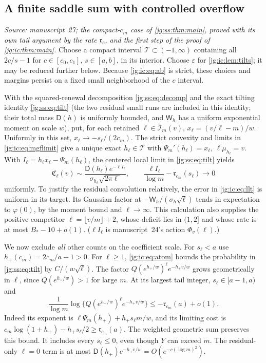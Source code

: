 \documentclass[11pt,a4paper]{article}
\theoremstyle{definition}\newaliascnt{definition}{theorem}
\theoremstyle{remark}\newaliascnt{remark}{theorem}
\begin{document}
\subsection{A finite saddle sum with controlled overflow}
\label{jg:sec:ic-saddle}
\emph{Source: manuscript~27; the compact-$c_m$ case of \cref{jg:ss:thm:main},
proved with its own tail argument by the rate $\mathfrak r_c$, and the first
step of the proof of \cref{jg:ic:thm:main}.} Choose a compact interval
$\mathcal T\subset(-1,\infty)$ containing all $2c/s-1$ for $c\in[c_0,c_1]$,
$s\in[a,b]$, in its interior. Choose $\varepsilon$ for \cref{jg:ic:lem:tilts};
it may be reduced further below. Because \eqref{jg:ic:eq:ab} is strict, these
choices and margins persist on a fixed small neighborhood of the $c$ interval.

With the squared-renewal decomposition \eqref{jg:ss:eq:decomp} and the exact
tilting identity \eqref{jg:ss:eq:tilt} (the two residual small runs are
included in this identity; their total mass $\mathsf D(h)$ is uniformly bounded,
and $\mathsf W_h$ has a uniform exponential moment on scale $w$), put, for each
retained $\ell\in\mathcal I_m(v)$, $x_\ell=(v/\ell-m)/w$. Uniformly in this set,
$x_\ell\to-s_\ell/(2c_m)$. The strict convexity and limits in
\eqref{jg:ic:eq:mgflimit} give a unique exact $h_\ell\in\mathcal T$ with
$\Psi_m'(h_\ell)=x_\ell$, $\ell\mu_{h_\ell}=v$. With
$I_\ell=h_\ell x_\ell-\Psi_m(h_\ell)$, the centered local limit in
\eqref{jg:ss:eq:tilt} yields
\begin{equation}\label{jg:ic:eq:saddle}
 \mathfrak C_\ell(v)\sim
 \frac{\mathsf D(h_\ell)e^{-\ell I_\ell}}
       {\sigma_{h_\ell}\sqrt{2\pi\ell}},
 \qquad
 \frac{\ell I_\ell}{\log m}-\mathfrak r_{c_m}(s_\ell)\longrightarrow0
\end{equation}
uniformly. To justify the residual convolution relatively, the error in
\eqref{jg:ic:eq:llt} is uniform in its target. Its Gaussian factor at
$-\mathsf W_h/(\sigma_h\sqrt\ell)$ tends in expectation to $\varphi(0)$, by the
moment bound and $\ell\to\infty$. This calculation also supplies the positive
competitor $\ell=\lfloor v/m\rfloor+2$, whose deficit lies in $(1,2]$ and whose
rate is at most $B_*-10+o(1)$. ($\ell I_\ell$ is manuscript~24's action
$\Phi_v(\ell)$.)

We now exclude \emph{all} other counts on the coefficient scale. For
$s_\ell<a$ use $h_+(c_m)=2c_m/a-1>0$. For $\ell\ge1$, \eqref{jg:ic:eq:atom}
bounds the probability in \eqref{jg:ss:eq:tilt} by $C/(w\sqrt\ell)$. The factor
$Q(e^{h_+/w})^\ell e^{-h_+v/w}$ grows geometrically in $\ell$, since
$Q(e^{h_+/w})>1$ for large $m$. At its largest tail integer,
$s_\ell\in[a-1,a)$ and
\[
 \frac1{\log m}\log\{Q(e^{h_+/w})^\ell e^{-h_+v/w}\}
 \le-\mathfrak r_{c_m}(a)+o(1).
\]
Indeed its exponent is $\ell\Psi_m(h_+)+h_+s_\ell m/w$, and its limiting cost is
$c_m\log(1+h_+)-h_+s_\ell/2\ge\mathfrak r_{c_m}(a)$. The weighted geometric sum
preserves this bound. It includes every $s_\ell\le0$, even though $Y$ can exceed
$m$. The residual-only $\ell=0$ term is at most
$\mathsf D(h_+)e^{-h_+v/w}=O(e^{-c(\log m)^2})$.
\end{document}
